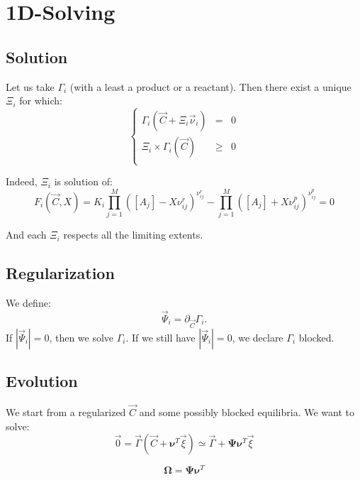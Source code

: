 \documentclass[aps,12pt]{revtex4}
\begin{document}
\section{1D-Solving}

\subsection{Solution}

Let us take $\Gamma_i$ (with a least a product or a reactant).
Then there exist a unique $\Xi_i$ for which:
\begin{equation}
\left\lbrace
\begin{array}{rcl}
	\Gamma_i(\vec{C} + \Xi_i \vec{\nu}_i ) & = & 0\\
	 \Xi_i \times \Gamma_i(\vec{C}) &\geq  &0\\
\end{array}
\right.
\end{equation}
 
Indeed, $\Xi_i$ is solution of:
\begin{equation}
	 F_i(\vec{C},X) =  K_i \prod_{j=1}^{M} \left([A_j] - X \nu^r_{ij}\right)^{\nu^r_{ij}} 
	- \prod_{j=1}^{M} \left([A_j] + X \nu^p_{ij} \right)^{\nu^p_{ij}} = 0
\end{equation} 

And each $\Xi_i$ respects all the limiting extents.

 \subsection{Regularization}
We define:
\begin{equation}
\vec{\Psi}_i = \partial_{\vec{C}} \Gamma_i.
\end{equation}
If $|\vec{\Psi}_i|=0$, then we solve $\Gamma_i$. If we still have $|\vec{\Psi}_i|=0$, we declare $\Gamma_i$ blocked.

\subsection{Evolution}

We start from a regularized $\vec{C}$ and some possibly blocked equilibria. We 
want to solve:
\begin{equation}
	\vec{0} = 	\vec{\Gamma}(\vec{C}+\bm{\nu}^T \vec{\xi}) \simeq \vec{\Gamma} + \bm{\Psi} \bm{\nu}^T \vec{\xi}
\end{equation}

\begin{equation}
	\bm{\Omega} = \bm{\Psi} \bm{\nu}^T
\end{equation}	
\end{document}

